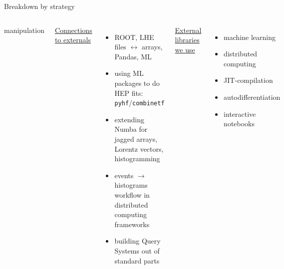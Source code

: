\documentclass[aspectratio=169]{beamer}
\begin{document}
\begin{frame}{Breakdown by strategy}
\begin{columns}[t]
\begin{itemize}
manipulation
\end{itemize}

\underline{\large Connections to externals}

\vspace{0.15 cm}
\begin{itemize}
\item ROOT, LHE files $\leftrightarrow$ arrays, Pandas, ML
\item using ML packages to do HEP fits: \texttt{pyhf}/\texttt{combinetf}
\item extending Numba for jagged arrays, Lorentz vectors, histogramming
\item events $\to$ histograms workflow in distributed computing frameworks
\item building Query Systems out of standard parts
\end{itemize}

\underline{\large External libraries we use}

\vspace{0.15 cm}
\begin{itemize}
\item machine learning
\item distributed computing
\item JIT-compilation
\item autodifferentiation
\item interactive notebooks
\end{itemize}

\end{columns}
\end{frame}
\end{document}
